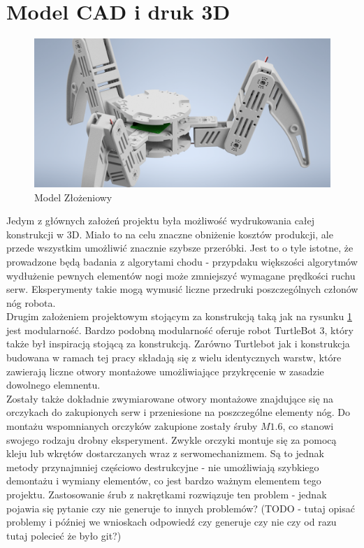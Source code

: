 \documentclass[a4paper,13pt]{article}
\begin{document}
\section{Model CAD i druk 3D}
\begin{figure}[H]
\includegraphics[width=\textwidth]{img/CAD_assembly.png}
\caption{Model Złożeniowy}
\label{CAD_assembly}
\end{figure}
Jedym z głównych założeń projektu była możliwość wydrukowania całej konstrukcji w 3D. Miało to na celu znaczne obniżenie kosztów produkcji, ale przede wszystkim umożliwić znacznie szybsze przeróbki. Jest to o tyle istotne, że prowadzone będą badania z algorytami chodu - przypdaku większości algorytmów wydłużenie pewnych elementów nogi może zmniejszyć wymagane prędkości ruchu serw. Eksperymenty takie mogą wymusić liczne przedruki poszczególnych członów nóg robota.\\

Drugim założeniem projektowym stojącym za konstrukcją taką jak na rysunku \ref{CAD_assembly} jest modularność. Bardzo podobną modularność oferuje robot TurtleBot 3, który także był inspiracją stojącą za konstrukcją. Zarówno Turtlebot jak i konstrukcja budowana w ramach tej pracy składają się z wielu identycznych warstw, które zawierają liczne otwory montażowe umożliwiające przykręcenie w zasadzie dowolnego elemnentu.\\

Zostały także dokładnie zwymiarowane otwory montażowe znajdujące się na orczykach do zakupionych serw i przeniesione na poszczególne elementy nóg. Do montażu wspomnianych orczyków zakupione zostały śruby $M1.6$, co stanowi swojego rodzaju drobny eksperyment. Zwykle orczyki montuje się za pomocą kleju lub wkrętów dostarczanych wraz z serwomechanizmem. Są to jednak metody przynajmniej częściowo destrukcyjne - nie umożliwiają szybkiego demontażu i wymiany elementów, co jest bardzo ważnym elementem tego projektu. Zastosowanie śrub z nakrętkami rozwiązuje ten problem - jednak pojawia się pytanie czy nie generuje to innych problemów? (TODO - tutaj opisać problemy i później we wnioskach odpowiedź czy generuje czy nie czy od razu tutaj polecieć że było git?)\\
\end{document}
